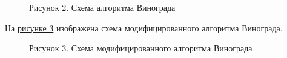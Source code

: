 \documentclass[12pt]{report}
\begin{document}
	\begin{figure}[h!]\label{Algorithm2}
		\caption*{Рисунок 2. Схема алгоритма Винограда}
	\end{figure}
	\newpage
	На \hyperref[Algorithm3]{рисунке 3} изображена схема модифицированного алгоритма Винограда.
	\begin{figure}[h!]\label{Algorithm3}
		\caption*{Рисунок 3. Схема модифицированного алгоритма Винограда}
	\end{figure}
	
\end{document}
